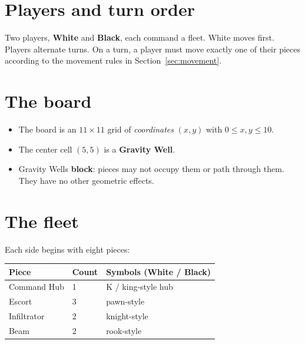 \documentclass[11pt,a4paper]{article}
\begin{document}
\section{Players and turn order}

Two players, \textbf{White} and \textbf{Black}, each command a fleet.
White moves first. Players alternate turns. On a turn, a player must move
exactly one of their pieces according to the movement rules in
Section~\ref{sec:movement}.

\section{The board}

\begin{itemize}[leftmargin=*]
  \item The board is an $11\times 11$ grid of \emph{coordinates}
        $(x,y)$ with $0 \le x,y \le 10$.
  \item The center cell $(5,5)$ is a \textbf{Gravity Well}.
  \item Gravity Wells \textbf{block}: pieces may not occupy them or path
        through them. They have no other geometric effects.
\end{itemize}

\section{The fleet}

Each side begins with eight pieces:

\begin{center}
\begin{tabular}{@{}lll@{}}
\toprule
\textbf{Piece} & \textbf{Count} & \textbf{Symbols (White / Black)} \\
\midrule
Command Hub   & 1 & $\mathrm{K}$ / king-style hub \\
Escort        & 3 & pawn-style \\
Infiltrator   & 2 & knight-style \\
Beam          & 2 & rook-style \\
\bottomrule
\end{tabular}
\end{center}
\end{document}
